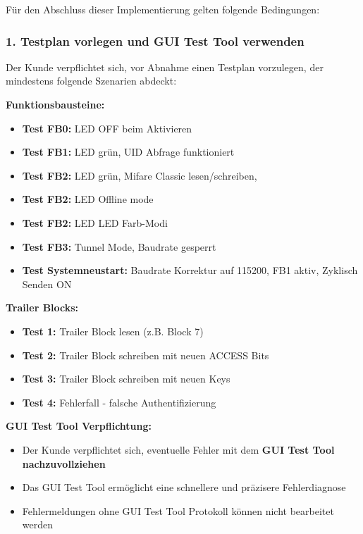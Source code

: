 \documentclass[a4paper,11pt]{article}
\providecommand{\tightlist}{\setlength{\itemsep}{0pt}\setlength{\parskip}{0pt}}
\begin{document}
Für den Abschluss dieser Implementierung gelten folgende Bedingungen:

\hypertarget{testplan-vorlegen-und-gui-test-tool-verwenden}{%
\subsubsection{1. Testplan vorlegen und GUI Test Tool
verwenden}\label{testplan-vorlegen-und-gui-test-tool-verwenden}}

Der Kunde verpflichtet sich, vor Abnahme einen Testplan vorzulegen, der
mindestens folgende Szenarien abdeckt:

\textbf{Funktionsbausteine:}

\begin{itemize}
\tightlist
\item
  \textbf{Test FB0:} LED OFF beim Aktivieren
\item
  \textbf{Test FB1:} LED grün, UID Abfrage funktioniert
\item
  \textbf{Test FB2:} LED grün, Mifare Classic lesen/schreiben,
\item
  \textbf{Test FB2:} LED Offline mode
\item
  \textbf{Test FB2:} LED LED Farb-Modi
\item
  \textbf{Test FB3:} Tunnel Mode, Baudrate gesperrt
\item
  \textbf{Test Systemneustart:} Baudrate Korrektur auf 115200, FB1
  aktiv, Zyklisch Senden ON
\end{itemize}

\textbf{Trailer Blocks:}

\begin{itemize}
\tightlist
\item
  \textbf{Test 1:} Trailer Block lesen (z.B. Block 7)
\item
  \textbf{Test 2:} Trailer Block schreiben mit neuen ACCESS Bits
\item
  \textbf{Test 3:} Trailer Block schreiben mit neuen Keys
\item
  \textbf{Test 4:} Fehlerfall - falsche Authentifizierung
\end{itemize}

\textbf{GUI Test Tool Verpflichtung:}

\begin{itemize}
\tightlist
\item
  Der Kunde verpflichtet sich, eventuelle Fehler mit dem \textbf{GUI
  Test Tool nachzuvollziehen}
\item
  Das GUI Test Tool ermöglicht eine schnellere und präzisere
  Fehlerdiagnose
\item
  Fehlermeldungen ohne GUI Test Tool Protokoll können nicht bearbeitet
  werden
\end{itemize}
\end{document}
